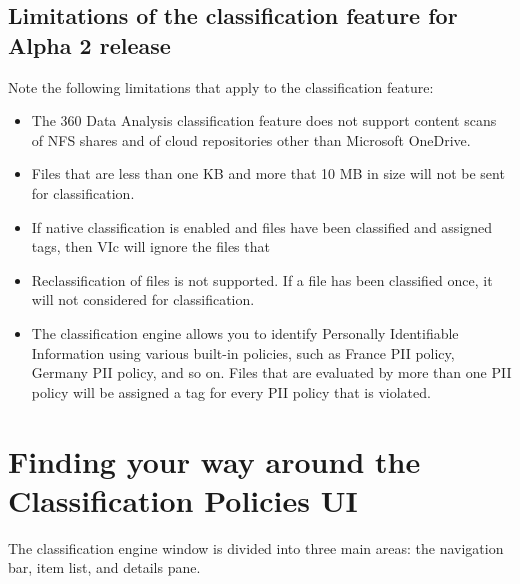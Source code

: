 \documentclass[letterpaper,10pt,english]{sphinxmanual}
\begin{document}
\subsection{Limitations of the classification feature for Alpha 2 release}
\label{\detokenize{mcdmp_app_ug:limitations-of-the-classification-feature-for-alpha-2-release}}
Note the following limitations that apply to the classification feature:
\begin{itemize}
\item {} 
The 360 Data Analysis classification feature does not support content scans of NFS shares and of cloud repositories other than Microsoft OneDrive.

\item {} 
Files that are less than one KB and more that 10 MB in size will not be sent for classification.

\item {} 
If native classification is enabled and files have been classified and assigned tags, then VIc will ignore the files that

\item {} 
Reclassification of files is not supported. If a file has been classified once, it will not considered for classification.

\item {} 
The classification engine allows you to identify Personally Identifiable Information using various built-in policies, such as France PII policy, Germany PII policy, and so on. Files that are evaluated by more than one PII policy will be assigned a tag for every PII policy that is violated.

\end{itemize}


\section{Finding your way around the Classification Policies UI}
\label{\detokenize{mcdmp_app_ug:finding-your-way-around-the-classification-policies-ui}}
The classification engine window is divided into three main areas: the navigation bar, item list, and details pane.

\begin{figure}[htbp]
\centering

\noindent{}
\end{figure}

\end{document}
